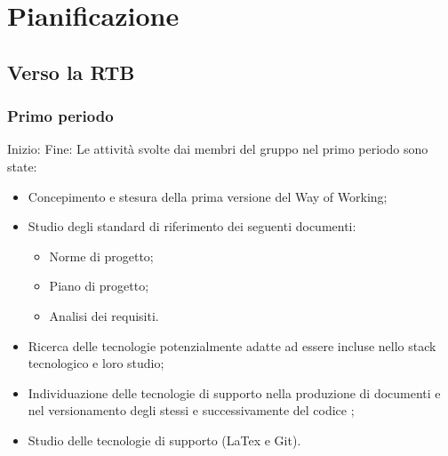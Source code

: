 
\section{Pianificazione}
\subsection{Verso la RTB}
\subsubsection{Primo periodo}
Inizio: \hline
Fine: \hline
{}
Le attività svolte dai membri del gruppo nel primo periodo sono state:
\begin{itemize}
    \item Concepimento e stesura della prima versione del Way of Working;
    \item Studio degli standard di riferimento dei seguenti documenti:
    \begin{itemize}
        \item Norme di progetto;
        \item Piano di progetto;
        \item Analisi dei requisiti.
    \end{itemize}
    \item Ricerca delle tecnologie potenzialmente adatte ad essere incluse nello
    stack tecnologico e loro studio;
    \item Individuazione delle tecnologie di supporto nella produzione di documenti 
    e nel versionamento degli stessi e successivamente del codice ;
    \item Studio delle tecnologie di supporto (LaTex e Git).
\end{itemize}

